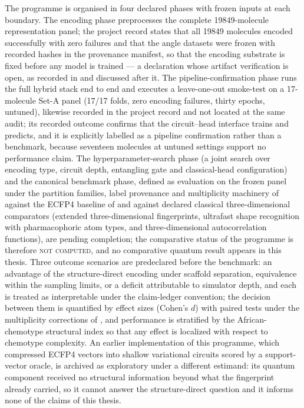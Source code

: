 The programme is organised in four declared phases with frozen inputs at each boundary. The encoding phase preprocesses the complete \num{19849}-molecule representation panel; the project record states that all \num{19849} molecules encoded successfully with zero failures and that the angle datasets were frozen with recorded hashes in the provenance manifest, so that the encoding substrate is fixed before any model is trained --- a declaration whose artifact verification is open, as recorded in  and discussed after it. The pipeline-confirmation phase runs the full hybrid stack end to end and executes a leave-one-out smoke-test on a \num{17}-molecule Set-A panel (\num{17}/\num{17} folds, zero encoding failures, thirty epochs, untuned), likewise recorded in the project record and not located at the same audit; its recorded outcome confirms that the circuit--head interface trains and predicts, and it is explicitly labelled as a pipeline confirmation rather than a benchmark, because seventeen molecules at untuned settings support no performance claim. The hyperparameter-search phase (a joint search over encoding type, circuit depth, entangling gate and classical-head configuration) and the canonical benchmark phase, defined as evaluation on the frozen panel under the partition families, label provenance and multiplicity machinery of  against the ECFP4 baseline of  and against declared classical three-dimensional comparators (extended three-dimensional fingerprints, ultrafast shape recognition with pharmacophoric atom types, and three-dimensional autocorrelation functions), are pending completion; the comparative status of the programme is therefore \textsc{not computed}, and no comparative quantum result appears in this thesis. Three outcome scenarios are predeclared before the benchmark: an advantage of the structure-direct encoding under scaffold separation, equivalence within the sampling limits, or a deficit attributable to simulator depth, and each is treated as interpretable under the claim-ledger convention; the decision between them is quantified by effect sizes (Cohen's $d$) with paired tests under the multiplicity corrections of , and performance is stratified by the African-chemotype structural index so that any effect is localized with respect to chemotype complexity. An earlier implementation of this programme, which compressed ECFP4 vectors into shallow variational circuits scored by a support-vector oracle, is archived as exploratory under a different estimand: its quantum component received no structural information beyond what the fingerprint already carried, so it cannot answer the structure-direct question and it informs none of the claims of this thesis.

